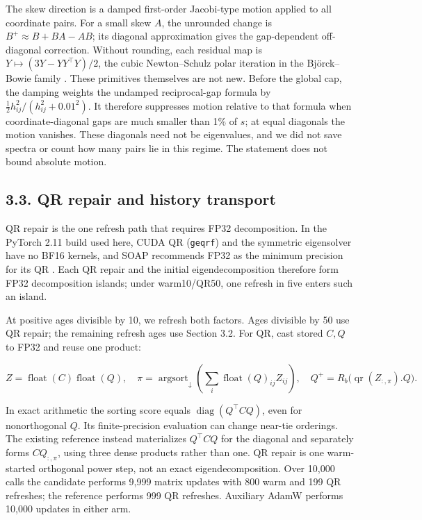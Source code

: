 The skew direction is a damped first-order Jacobi-type motion
applied to all coordinate pairs. For a small skew \(A\), the unrounded
change is \(B^+\approx B+BA-AB\); its diagonal approximation gives the
gap-dependent off-diagonal correction. Without rounding, each residual
map is \(Y\mapsto(3Y-YY^\top Y)/2\), the cubic Newton--Schulz polar
iteration in the Björck--Bowie family
\citep{bjorck1971iterative,higham2008functions}. These primitives themselves are
not new. Before the global cap, the damping weights the undamped
reciprocal-gap formula by \(\tfrac12 h_{ij}^2/(h_{ij}^2+0.01^2)\). It
therefore suppresses motion relative to that formula when
coordinate-diagonal gaps are much smaller than 1\% of \(s\); at equal
diagonals the motion vanishes. These diagonals need not be eigenvalues,
and we did not save spectra or count how many pairs lie in this regime.
The statement does not bound absolute motion.

\hypertarget{qr-repair-and-history-transport}{%
\subsection{3.3. QR repair and history
transport}\label{qr-repair-and-history-transport}}

QR repair is the one refresh path that requires FP32 decomposition. In the PyTorch
2.11 build used here, CUDA QR (\texttt{geqrf}) and the symmetric
eigensolver have no BF16 kernels,
and SOAP recommends FP32 as the minimum precision for its QR
\citep{vyas2024soap}. Each QR repair and the initial
eigendecomposition therefore form FP32 decomposition islands; under
warm10/QR50, one refresh in five enters such an island.

At positive ages divisible by 10, we refresh both factors. Ages
divisible by 50 use QR repair; the remaining refresh ages use Section
3.2. For QR, cast stored \(C,Q\) to FP32 and reuse one product:

\[
Z=\operatorname{float}(C)\operatorname{float}(Q),\quad
\pi=\operatorname{argsort}_{\downarrow}
 \left(\sum_i\operatorname{float}(Q)_{ij}Z_{ij}\right),\quad
Q^+=R_b\bigl(\operatorname{qr}(Z_{:,\pi}).Q\bigr).
\]

In exact arithmetic the sorting score equals
\(\operatorname{diag}(Q^\top C Q)\), even for nonorthogonal \(Q\). Its
finite-precision evaluation can change near-tie orderings. The existing
reference instead materializes \(Q^\top C Q\) for the diagonal and
separately forms \(CQ_{:,\pi}\), using three dense products rather than
one. QR repair is one warm-started orthogonal power step, not an exact
eigendecomposition. Over 10,000 calls the candidate performs 9,999
matrix updates with 800 warm and 199 QR refreshes; the reference
performs 999 QR refreshes. Auxiliary AdamW performs 10,000 updates in
either arm.

